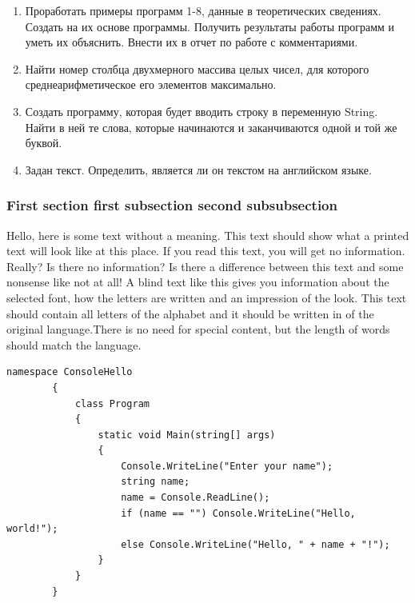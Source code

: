 \documentclass[a4paper,14pt]{extarticle}
\begin{document}
    \begin{enumerate}
        
        \item Проработать примеры программ 1-8, данные в теоретических сведениях.
              Создать на их основе программы. Получить результаты работы программ
              и уметь их объяснить. Внести их в отчет по работе с комментариями.

        \item Найти номер столбца двухмерного массива целых чисел, для которого
              среднеарифметическое его элементов максимально.
              
        \item Создать программу, которая будет вводить строку в переменную String.
              Найти в ней те слова, которые начинаются и заканчиваются одной и той же
              буквой.

        \item Задан текст. Определить, является ли он текстом на английском языке.

    \end{enumerate}

    \subsubsection{First section first subsection second subsubsection}

    Hello, here is some text without a meaning.  This text should show what 
    a printed text will look like at this place.  If you read this text, 
    you will get no information.  Really?  Is there no information?  Is there 
    a difference between this text and some nonsense like not at all!  A 
    blind text like this gives you information about the selected font, how 
    the letters are written and an impression of the look.  This text should
    contain all letters of the alphabet and it should be written in of the
    original language.There is no need for special content, but the length of
    words should match the language.

    \begin{lstlisting}[language={[Sharp]C}]
        namespace ConsoleHello
        { 
            class Program
            {	
                static void Main(string[] args)
                { 
                    Console.WriteLine("Enter your name"); 
                    string name;
                    name = Console.ReadLine();
                    if (name == "") Console.WriteLine("Hello, world!"); 
                    else Console.WriteLine("Hello, " + name + "!");
                }
            }
        }
    \end{lstlisting}
\end{document}
